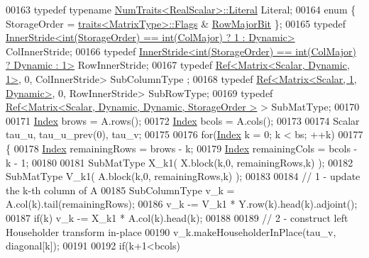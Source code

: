 \begin{DoxyCode}
00163   \textcolor{keyword}{typedef} \textcolor{keyword}{typename} \hyperlink{group___core___module_struct_eigen_1_1_num_traits}{NumTraits<RealScalar>::Literal} Literal;
00164   \textcolor{keyword}{enum} \{ StorageOrder = \hyperlink{struct_eigen_1_1internal_1_1traits}{traits<MatrixType>::Flags} & 
      \hyperlink{group__flags_gae4f56c2a60bbe4bd2e44c5b19cbe8762}{RowMajorBit} \};
00165   \textcolor{keyword}{typedef} \hyperlink{class_eigen_1_1_inner_stride}{InnerStride<int(StorageOrder) == int(ColMajor) ? 1 : Dynamic>}
       ColInnerStride;
00166   \textcolor{keyword}{typedef} \hyperlink{class_eigen_1_1_inner_stride}{InnerStride<int(StorageOrder) == int(ColMajor) ? Dynamic : 1>}
       RowInnerStride;
00167   \textcolor{keyword}{typedef} \hyperlink{group___core___module_class_eigen_1_1_ref}{Ref<Matrix<Scalar, Dynamic, 1>}, 0, ColInnerStride>    SubColumnType
      ;
00168   \textcolor{keyword}{typedef} \hyperlink{group___core___module_class_eigen_1_1_ref}{Ref<Matrix<Scalar, 1, Dynamic>}, 0, RowInnerStride>    SubRowType;
00169   \textcolor{keyword}{typedef} \hyperlink{group___core___module_class_eigen_1_1_ref}{Ref<Matrix<Scalar, Dynamic, Dynamic, StorageOrder >}
       > SubMatType;
00170   
00171   \hyperlink{class_eigen_1_1internal_1_1_upper_bidiagonalization_adcb14f3919a3dcc9977ba6b8105087fe}{Index} brows = A.rows();
00172   \hyperlink{class_eigen_1_1internal_1_1_upper_bidiagonalization_adcb14f3919a3dcc9977ba6b8105087fe}{Index} bcols = A.cols();
00173 
00174   Scalar tau\_u, tau\_u\_prev(0), tau\_v;
00175 
00176   \textcolor{keywordflow}{for}(\hyperlink{class_eigen_1_1internal_1_1_upper_bidiagonalization_adcb14f3919a3dcc9977ba6b8105087fe}{Index} k = 0; k < bs; ++k)
00177   \{
00178     \hyperlink{class_eigen_1_1internal_1_1_upper_bidiagonalization_adcb14f3919a3dcc9977ba6b8105087fe}{Index} remainingRows = brows - k;
00179     \hyperlink{class_eigen_1_1internal_1_1_upper_bidiagonalization_adcb14f3919a3dcc9977ba6b8105087fe}{Index} remainingCols = bcols - k - 1;
00180 
00181     SubMatType X\_k1( X.block(k,0, remainingRows,k) );
00182     SubMatType V\_k1( A.block(k,0, remainingRows,k) );
00183 
00184     \textcolor{comment}{// 1 - update the k-th column of A}
00185     SubColumnType v\_k = A.col(k).tail(remainingRows);
00186           v\_k -= V\_k1 * Y.row(k).head(k).adjoint();
00187     \textcolor{keywordflow}{if}(k) v\_k -= X\_k1 * A.col(k).head(k);
00188     
00189     \textcolor{comment}{// 2 - construct left Householder transform in-place}
00190     v\_k.makeHouseholderInPlace(tau\_v, diagonal[k]);
00191        
00192     \textcolor{keywordflow}{if}(k+1<bcols)

\end{DoxyCode}
